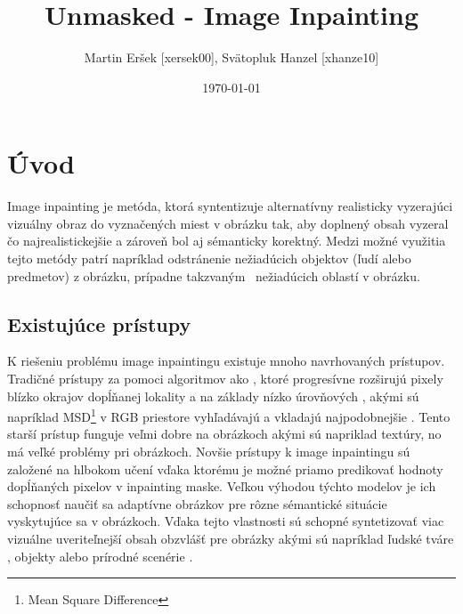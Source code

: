 \documentclass [11pt, a4paper]{article}
\title{Unmasked - Image Inpainting}
\author{Martin Eršek [xersek00], Svätopluk Hanzel [xhanze10]}
\date{\today}
\begin{document}
	\maketitle

	\section{Úvod}
		Image inpainting je metóda, ktorá syntentizuje alternatívny realisticky vyzerajúci vizuálny obraz do vyznačených miest v obrázku tak, aby doplnený obsah vyzeral čo najrealistickejšie a zároveň bol aj sémanticky korektný. Medzi možné využitia tejto metódy patrí napríklad odstránenie nežiadúcich objektov (ľudí alebo predmetov) z obrázku, prípadne takzvaným \, nežiadúcich oblastí v obrázku.
	
	\subsection{Existujúce prístupy}
		K riešeniu problému image inpaintingu existuje mnoho navrhovaných prístupov. Tradičné  prístupy za pomoci  algoritmov ako \cite{quilting, Efros99}, ktoré progresívne rozširujú pixely blízko okrajov dopĺňanej lokality a na základy nízko úrovňových , akými sú napríklad MSD\footnote{Mean Square Difference} v RGB priestore vyhľadávajú a vkladajú  najpodobnejšie . Tento starší prístup funguje veľmi dobre na  obrázkoch akými sú napriklad textúry, no má veľké problémy pri  obrázkoch.
		Novšie prístupy k image inpaintingu sú založené na hlbokom učení vďaka ktorému je možné priamo predikovať hodnoty dopĺňaných pixelov v inpainting maske. Veľkou výhodou týchto modelov je ich schopnosť naučiť sa adaptívne  obrázkov pre rôzne sémantické situácie vyskytujúce sa v obrázkoch. Vďaka tejto vlastnosti sú schopné syntetizovať viac vizuálne uveriteľnejší obsah obzvlášť pre obrázky akými sú napríklad ľudské tváre \cite{li2017generative, yeh2017semantic, globloc, yu2018generative, yu2018free}, objekty \cite{pathak2016context, yu2018free} alebo prírodné scenérie \cite{globloc, yu2018generative, yu2018free}.
	
\end{document}
